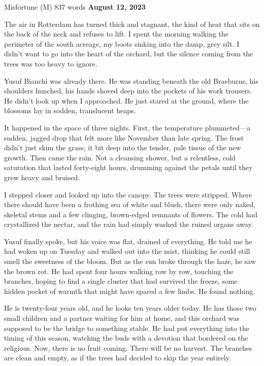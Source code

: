 \documentclass{article} %
\begin{document}
\begin{corpusdoc}[Mcolor]{Misfortune (M) \hfill 837 words}
\textbf{August 12, 2023}

The air in Rotterdam has turned thick and stagnant, the kind of heat that sits on the back of the neck and refuses to lift. I spent the morning walking the perimeter of the south acreage, my boots sinking into the damp, grey silt. I didn't want to go into the heart of the orchard, but the silence coming from the trees was too heavy to ignore.

Yusuf Bianchi was already there. He was standing beneath the old Braeburns, his shoulders hunched, his hands shoved deep into the pockets of his work trousers. He didn't look up when I approached. He just stared at the ground, where the blossoms lay in sodden, translucent heaps.

It happened in the space of three nights. First, the temperature plummeted---a sudden, jagged drop that felt more like November than late spring. The frost didn't just skim the grass; it bit deep into the tender, pale tissue of the new growth. Then came the rain. Not a cleansing shower, but a relentless, cold saturation that lasted forty-eight hours, drumming against the petals until they grew heavy and bruised.

I stepped closer and looked up into the canopy. The trees were stripped. Where there should have been a frothing sea of white and blush, there were only naked, skeletal stems and a few clinging, brown-edged remnants of flowers. The cold had crystallized the nectar, and the rain had simply washed the ruined organs away.

Yusuf finally spoke, but his voice was flat, drained of everything. He told me he had woken up on Tuesday and walked out into the mist, thinking he could still smell the sweetness of the bloom. But as the sun broke through the haze, he saw the brown rot. He had spent four hours walking row by row, touching the branches, hoping to find a single cluster that had survived the freeze, some hidden pocket of warmth that might have spared a few limbs. He found nothing.

He is twenty-four years old, and he looks ten years older today. He has those two small children and a partner waiting for him at home, and this orchard was supposed to be the bridge to something stable. He had put everything into the timing of this season, watching the buds with a devotion that bordered on the religious. Now, there is no fruit coming. There will be no harvest. The branches are clean and empty, as if the trees had decided to skip the year entirely.


\end{corpusdoc}
\end{document}
